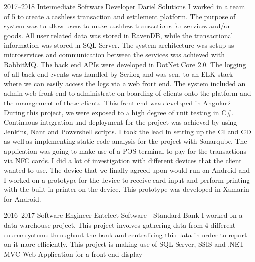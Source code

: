 \documentclass[]{friggeri-cv} %
\begin{document}
\begin{entrylist}
\entry
{2017--2018} %
{Intermediate Software Developer}
{Dariel Solutions}
{I worked in a team of 5 to create a cashless transaction and settlement platform. The purpose of system was to allow users to make cashless transactions for services and/or goods. All user related data was stored in RavenDB, while the transactional information was stored in SQL Server. The system architecture was setup as microservices and communication between the services was achieved with RabbitMQ. The back end APIs were developed in DotNet Core 2.0. The logging of all back end events was handled by Serilog and was sent to an ELK stack where we can easily access the logs via a web front end. The system included an admin web front end to administrate on-boarding of clients onto the platform and the management of these clients. This front end was developed in Angular2. During this project, we were exposed to a high degree of unit testing in C\#. Continuous integration and deployment for the project was achieved by using Jenkins, Nant and Powershell scripts. I took the lead in setting up the CI and CD as well as implementing static code analysis for the project with Sonarqube. The application was going to make use of a POS terminal to pay for the transactions via NFC cards. I did a lot of investigation with different devices that the client wanted to use. The device that we finally agreed upon would run on Android and I worked on a prototype for the device to receive card input and perform printing with the built in printer on the device. This prototype was developed in Xamarin for Android.}

\entry
{2016--2017} %
{Software Engineer}
{Entelect Software - Standard Bank} %
{I worked on a data warehouse project. This project involves gathering data from 4 different source systems throughout the bank and centralising this data in order to report on it more efficiently. This project is making use of SQL Server, SSIS and .NET MVC Web Application for a front end display}

\end{entrylist}

\newpage
\end{document}
